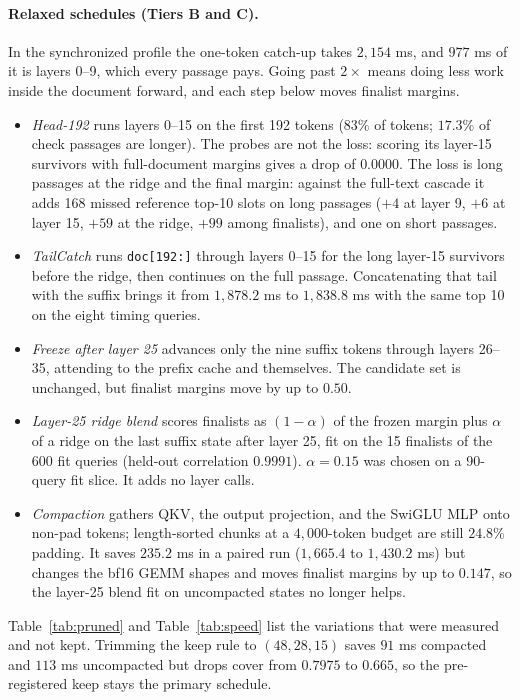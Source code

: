 \documentclass[11pt, a4paper]{article}
\begin{document}
\paragraph{Relaxed schedules (Tiers B and C).}
\label{sec:tiers}
In the synchronized profile the one-token catch-up takes $2{,}154$ ms, and $977$ ms of it is layers 0--9, which every passage pays.
Going past $2\times$ means doing less work inside the document forward, and each step below moves finalist margins.
\begin{itemize}
\item \emph{Head-192} runs layers 0--15 on the first 192 tokens ($83\%$ of tokens; $17.3\%$ of check passages are longer). The probes are not the loss: scoring its layer-15 survivors with full-document margins gives a drop of $0.0000$. The loss is long passages at the ridge and the final margin: against the full-text cascade it adds 168 missed reference top-10 slots on long passages ($+4$ at layer 9, $+6$ at layer 15, $+59$ at the ridge, $+99$ among finalists), and one on short passages.
\item \emph{TailCatch} runs \texttt{doc[192:]} through layers 0--15 for the long layer-15 survivors before the ridge, then continues on the full passage. Concatenating that tail with the suffix brings it from $1{,}878.2$ ms to $1{,}838.8$ ms with the same top 10 on the eight timing queries.
\item \emph{Freeze after layer 25} advances only the nine suffix tokens through layers 26--35, attending to the prefix cache and themselves. The candidate set is unchanged, but finalist margins move by up to $0.50$.
\item \emph{Layer-25 ridge blend} scores finalists as $(1-\alpha)$ of the frozen margin plus $\alpha$ of a ridge on the last suffix state after layer 25, fit on the 15 finalists of the 600 fit queries (held-out correlation $0.9991$). $\alpha = 0.15$ was chosen on a 90-query fit slice. It adds no layer calls.
\item \emph{Compaction} gathers QKV, the output projection, and the SwiGLU MLP onto non-pad tokens; length-sorted chunks at a $4{,}000$-token budget are still $24.8\%$ padding. It saves $235.2$ ms in a paired run ($1{,}665.4$ to $1{,}430.2$ ms) but changes the bf16 GEMM shapes and moves finalist margins by up to $0.147$, so the layer-25 blend fit on uncompacted states no longer helps.
\end{itemize}
Table~\ref{tab:pruned} and Table~\ref{tab:speed} list the variations that were measured and not kept.
Trimming the keep rule to $(48, 28, 15)$ saves $91$ ms compacted and $113$ ms uncompacted but drops cover from $0.7975$ to $0.665$, so the pre-registered keep stays the primary schedule.
\end{document}
